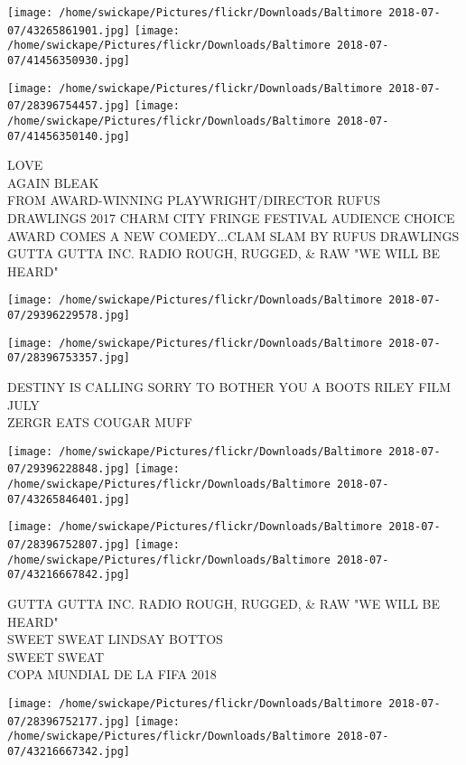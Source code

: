 \documentclass[10pt,letterpaper]{article}
\begin{document}
\texttt{[image: /home/swickape/Pictures/flickr/Downloads/Baltimore 2018-07-07/43265861901.jpg]}
\texttt{[image: /home/swickape/Pictures/flickr/Downloads/Baltimore 2018-07-07/41456350930.jpg]}

\texttt{[image: /home/swickape/Pictures/flickr/Downloads/Baltimore 2018-07-07/28396754457.jpg]}
\texttt{[image: /home/swickape/Pictures/flickr/Downloads/Baltimore 2018-07-07/41456350140.jpg]}

LOVE\\
AGAIN BLEAK\\
FROM AWARD{-}WINNING PLAYWRIGHT/DIRECTOR RUFUS DRAWLINGS 2017 CHARM CITY FRINGE FESTIVAL AUDIENCE CHOICE AWARD COMES A NEW COMEDY...CLAM SLAM BY RUFUS DRAWLINGS\\
GUTTA GUTTA INC. RADIO ROUGH, RUGGED, \& RAW "WE WILL BE HEARD"
\pagebreak

\texttt{[image: /home/swickape/Pictures/flickr/Downloads/Baltimore 2018-07-07/29396229578.jpg]}

\vspace{0.25in}
\texttt{[image: /home/swickape/Pictures/flickr/Downloads/Baltimore 2018-07-07/28396753357.jpg]}

DESTINY IS CALLING SORRY TO BOTHER YOU A BOOTS RILEY FILM JULY\\
ZERGR EATS COUGAR MUFF
\pagebreak

\texttt{[image: /home/swickape/Pictures/flickr/Downloads/Baltimore 2018-07-07/29396228848.jpg]}
\texttt{[image: /home/swickape/Pictures/flickr/Downloads/Baltimore 2018-07-07/43265846401.jpg]}

\texttt{[image: /home/swickape/Pictures/flickr/Downloads/Baltimore 2018-07-07/28396752807.jpg]}
\texttt{[image: /home/swickape/Pictures/flickr/Downloads/Baltimore 2018-07-07/43216667842.jpg]}

GUTTA GUTTA INC. RADIO ROUGH, RUGGED, \& RAW "WE WILL BE HEARD"\\
SWEET SWEAT LINDSAY BOTTOS\\
SWEET SWEAT\\
COPA MUNDIAL DE LA FIFA 2018
\pagebreak

\texttt{[image: /home/swickape/Pictures/flickr/Downloads/Baltimore 2018-07-07/28396752177.jpg]}
\texttt{[image: /home/swickape/Pictures/flickr/Downloads/Baltimore 2018-07-07/43216667342.jpg]}
\end{document}
